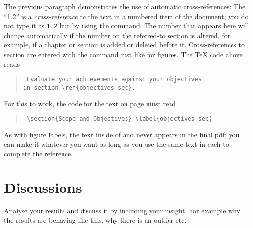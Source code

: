 The previous paragraph demonstrates the use of automatic cross-references:  The 
``1.2'' is a \textit{cross-reference} to the text in a numbered item of the 
document; you do not type it as \texttt{1.2} but by using the  
command. The number that appears here will change automatically if the number 
on the referred-to section is altered, for example, if a chapter or section is 
added or deleted before it. Cross-references to section are entered with the 
 command just like for figures. The \TeX{} code above reads
\begin{quote}\tt
	Evaluate your achievements against your objectives \\[-0.5em]
	in section \textbackslash{}ref\{objectives sec\}.
\end{quote}
For this to work, the code for the text on page \pageref{objectives sec} must 
read
\begin{quote}\tt
	\textbackslash{}section\{Scope and Objectives\} 
	\textbackslash{}label\{objectives sec\}
\end{quote}
As with figure labels, the text inside of  and  never 
appears in the final pdf; you can make it whatever you want as long as you use 
the same text in each to complete the reference.

\section{Discussions}
Analyse your results and discuss it by including your insight. For example why 
the results are behaving like this, why there is an outlier etc.